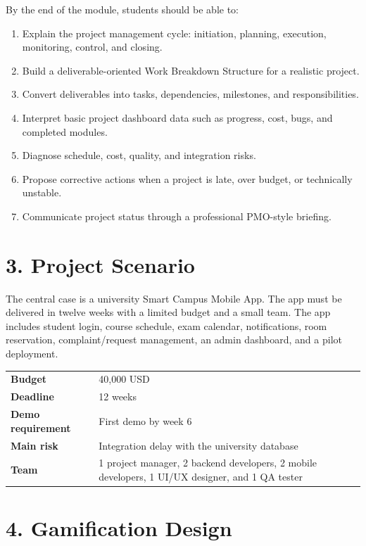 \documentclass[11pt,a4paper]{article}
\begin{document}
By the end of the module, students should be able to:

\begin{enumerate}
  \item Explain the project management cycle: initiation, planning, execution, monitoring, control, and closing.
  \item Build a deliverable-oriented Work Breakdown Structure for a realistic project.
  \item Convert deliverables into tasks, dependencies, milestones, and responsibilities.
  \item Interpret basic project dashboard data such as progress, cost, bugs, and completed modules.
  \item Diagnose schedule, cost, quality, and integration risks.
  \item Propose corrective actions when a project is late, over budget, or technically unstable.
  \item Communicate project status through a professional PMO-style briefing.
\end{enumerate}

\section*{3. Project Scenario}

The central case is a university Smart Campus Mobile App. The app must be delivered in twelve weeks with a limited budget and a small team. The app includes student login, course schedule, exam calendar, notifications, room reservation, complaint/request management, an admin dashboard, and a pilot deployment.

\begin{tabular}{>{\bfseries}p{4cm}p{10.5cm}}
Budget & 40,000 USD \\
Deadline & 12 weeks \\
Demo requirement & First demo by week 6 \\
Main risk & Integration delay with the university database \\
Team & 1 project manager, 2 backend developers, 2 mobile developers, 1 UI/UX designer, and 1 QA tester \\
\end{tabular}

\section*{4. Gamification Design}
\end{document}
